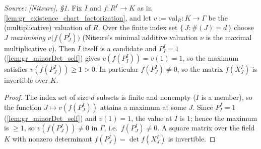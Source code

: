\begin{lemma}

  \label{lem:gr_existence_minimal_valuation}
  \textit{Source: [Nitsure], \S 1.}
  Fix \(I\) and \(f : R^I \to K\) as in \cref{lem:gr_existence_chart_factorization},
  and let \(v := \mathrm{val}_R : K \to \Gamma\) be the (multiplicative) valuation
  of \(R\). Over the finite index set \(\{\, J : \#(J) = d \,\}\) choose \(J\)
  \emph{maximising} \(v\bigl(f(P^I_J)\bigr)\) (Nitsure's minimal additive valuation
  \(\nu\) is the maximal multiplicative \(v\)). Then \(I\) itself is a candidate and
  \(P^I_I = 1\) (\cref{lem:gr_minorDet_self}) gives \(v(f(P^I_I)) = v(1) = 1\), so
  the maximum satisfies \(v(f(P^I_J)) \ge 1 > 0\). In particular \(f(P^I_J) \ne 0\),
  so the matrix \(f(X^I_J)\) is invertible over \(K\).
\end{lemma}
\begin{proof}
  \leanok
  The index set of size-\(d\) subsets is finite and nonempty (\(I\) is a member),
  so the function \(J \mapsto v(f(P^I_J))\) attains a maximum at some \(J\). Since
  \(P^I_I = 1\) (\cref{lem:gr_minorDet_self}) and \(v(1) = 1\), the value at \(I\)
  is \(1\); hence the maximum is \(\ge 1\), so \(v(f(P^I_J)) \ne 0\) in \(\Gamma\),
  i.e.\ \(f(P^I_J) \ne 0\). A square matrix over the field \(K\) with nonzero
  determinant \(f(P^I_J) = \det f(X^I_J)\) is invertible.
\end{proof}

